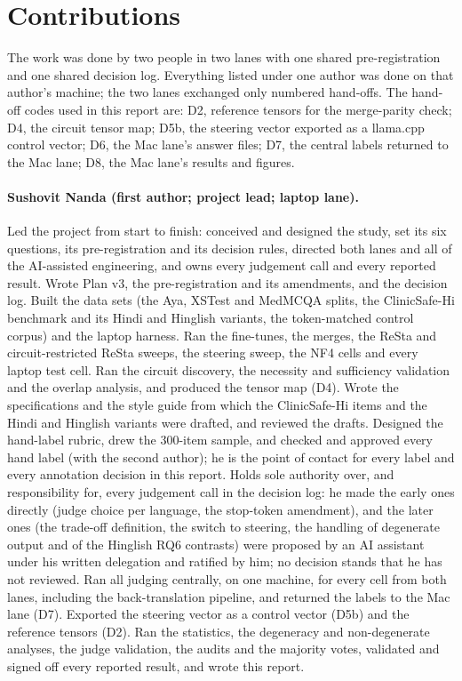 \section*{Contributions}\label{sec:contrib}

The work was done by two people in two lanes with one shared pre-registration and one shared decision log. Everything listed under one author was done on that author's machine; the two lanes exchanged only numbered hand-offs. The hand-off codes used in this report are: D2, reference tensors for the merge-parity check; D4, the circuit tensor map; D5b, the steering vector exported as a llama.cpp control vector; D6, the Mac lane's answer files; D7, the central labels returned to the Mac lane; D8, the Mac lane's results and figures.

\paragraph{Sushovit Nanda (first author; project lead; laptop lane).} Led the project from start to finish: conceived and designed the study, set its six questions, its pre-registration and its decision rules, directed both lanes and all of the AI-assisted engineering, and owns every judgement call and every reported result. Wrote Plan v3, the pre-registration and its amendments, and the decision log. Built the data sets (the Aya, XSTest and MedMCQA splits, the ClinicSafe-Hi benchmark and its Hindi and Hinglish variants, the token-matched control corpus) and the laptop harness. Ran the fine-tunes, the merges, the ReSta and circuit-restricted ReSta sweeps, the steering sweep, the NF4 cells and every laptop test cell. Ran the circuit discovery, the necessity and sufficiency validation and the overlap analysis, and produced the tensor map (D4). Wrote the specifications and the style guide from which the ClinicSafe-Hi items and the Hindi and Hinglish variants were drafted, and reviewed the drafts. Designed the hand-label rubric, drew the 300-item sample, and checked and approved every hand label (with the second author); he is the point of contact for every label and every annotation decision in this report. Holds sole authority over, and responsibility for, every judgement call in the decision log: he made the early ones directly (judge choice per language, the stop-token amendment), and the later ones (the trade-off definition, the switch to steering, the handling of degenerate output and of the Hinglish RQ6 contrasts) were proposed by an AI assistant under his written delegation and ratified by him; no decision stands that he has not reviewed. Ran all judging centrally, on one machine, for every cell from both lanes, including the back-translation pipeline, and returned the labels to the Mac lane (D7). Exported the steering vector as a control vector (D5b) and the reference tensors (D2). Ran the statistics, the degeneracy and non-degenerate analyses, the judge validation, the audits and the majority votes, validated and signed off every reported result, and wrote this report.

